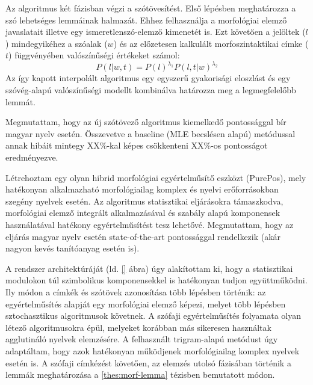 Az algoritmus két fázisban végzi a szótövesítést. 
Első lépésben meghatározza a szó lehetséges lemmáinak halmazát. Ehhez felhasználja a morfológiai elemző javaslatait illetve egy ismeretlenszó-elemző kimenetét is. 
Ezt követően a jelöltek ($l$) mindegyikéhez a szóalak ($w$) és az előzetesen kalkulált morfoszintaktikai címke ($t$) függvényében valószínűségi értékeket számol:
\begin{equation}\label{lemma-interpolated}
P(l|w,t) = P(l)^{\lambda_1} P(l,t|w)^{\lambda_2}
\end{equation}
Az így kapott interpolált algoritmus egy egyszerű gyakorisági eloszlást és egy szóvég-alapú valószínűségi modellt kombinálva határozza meg a legmegfelelőbb lemmát.

Megmutattam, hogy az új szótövező algoritmus kiemelkedő pontossággal bír magyar nyelv esetén. 
Összevetve a baseline (MLE becslésen alapú) metódussal annak hibáit mintegy XX\%-kal képes csökkenteni XX\%-os pontosságot eredményezve.


\thesisline%


\begin{core}
\begin{thesis}\label{thes:morf-tagging}
Létrehoztam egy olyan hibrid morfológiai egyértelműsítő eszközt (PurePos), mely hatékonyan alkalmazható  morfológiailag komplex és nyelvi erőforrásokban szegény nyelvek esetén. 
Az algoritmus statisztikai eljárásokra támaszkodva, morfológiai elemző integrált alkalmazásával és szabály alapú komponensek használatával hatékony egyértelműsítést tesz lehetővé. 
Megmutattam, hogy az eljárás magyar nyelv esetén state-of-the-art pontossággal rendelkezik (akár nagyon kevés tanítóanyag esetén is).
\end{thesis}

\begin{pub}
\cite{Orosz2011,Orosz2012,Orosz2012a,Orosz2013a}
\end{pub}
\end{core}

\begin{center}
\end{center}

A rendszer architektúráját  (ld. \ref{} ábra) úgy alakítottam ki, hogy a statisztikai modulokon túl szimbolikus komponensekkel is hatékonyan tudjon együttműködni. 
Ily módon a címkék és szótövek azonosítása több lépésben történik:
az egyértelműsítés alapját egy morfológiai elemző képezi, melyet több lépésben sztochasztikus algoritmusok követnek. 
A szófaji egyértelműsítés folyamata olyan létező algoritmusokra épül, melyeket korábban más sikeresen használtak agglutináló nyelvek elemzésére. 
A felhasznált trigram-alapú metódust úgy adaptáltam, hogy azok hatékonyan működjenek morfológiailag komplex nyelvek esetén is.
A szófaji címkézést követően, az elemzés utolsó fázisában történik a lemmák meghatározása a \ref{thes:morf-lemma} tézisben bemutatott módon.


